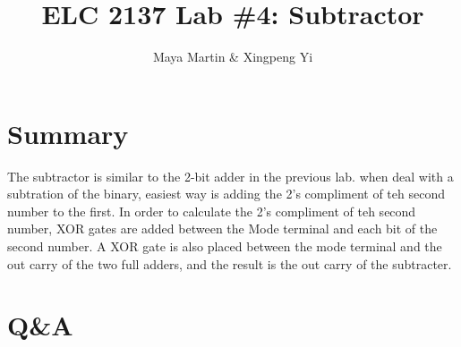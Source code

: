 \documentclass[11pt]{article}
\begin{document}
\title{ELC 2137 Lab \#4: Subtractor}
\author{Maya Martin \& Xingpeng Yi}

\maketitle


\section*{Summary}

The subtractor is similar to the 2-bit adder in the previous lab. when deal with a subtration of the binary, easiest way is adding the 2's compliment of teh second number to the first. In order to calculate the 2's compliment of teh second number, XOR gates are added between the Mode terminal and each bit of the second  number. A XOR gate is also placed between the mode terminal and the out carry of the two full adders, and the result is the out carry of the subtracter. 


\section*{Q\&A}
\end{document}
